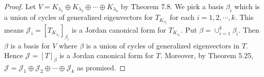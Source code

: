 \begin{Exercise}
\begin{proof}
Let $V = K_{\lambda_1}\oplus K_{\lambda_2} \oplus \cdots \oplus K_{\lambda_k}$ by Theorem 7.8. We pick a basis $\beta_i$ which is a union of cycles of generalized eigenvectors for $T_{K_{\lambda_i}}$ for each $i=1,2,\cdots,k$. This means $\mathcal{J}_i = [T_{K_{\lambda_i}}]_{\beta_i}$ is a Jordan canonical form for $T_{K_{\lambda_i}}$. Put $\beta = \cup_{i=1}^{k}\beta_i$. Then $\beta$ is a basis for $V$ where $\beta$ is a union of cycles of generalized eigenvectors in $T$. Hence $\mathcal{J} = [T]_{\beta}$ is a Jordan canonical form for $T$. Moreover, by Theorem 5.25, $\mathcal{J} = \mathcal{J}_1\oplus\mathcal{J}_2\oplus\cdots\oplus\mathcal{J}_k$ as promised.
\end{proof}
\end{Exercise}